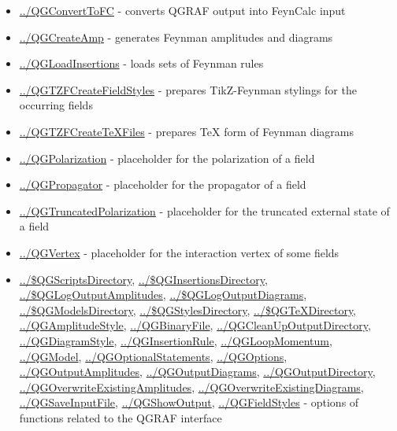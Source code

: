 \documentclass[../FeynHelpersManual.tex]{subfiles}
\begin{document}
\begin{itemize}
\tightlist
\item
  \hyperlink{../qgconverttofc}{../QGConvertToFC} - converts QGRAF output
  into FeynCalc input
\item
  \hyperlink{../qgcreateamp}{../QGCreateAmp} - generates Feynman
  amplitudes and diagrams
\item
  \hyperlink{../qgloadinsertions}{../QGLoadInsertions} - loads sets of
  Feynman rules
\item
  \hyperlink{../qgtzfcreatefieldstyles}{../QGTZFCreateFieldStyles} -
  prepares TikZ-Feynman stylings for the occurring fields
\item
  \hyperlink{../qgtzfcreatetexfiles}{../QGTZFCreateTeXFiles} - prepares
  TeX form of Feynman diagrams
\item
  \hyperlink{../qgpolarization}{../QGPolarization} - placeholder for the
  polarization of a field
\item
  \hyperlink{../qgpropagator}{../QGPropagator} - placeholder for the
  propagator of a field
\item
  \hyperlink{../qgtruncatedpolarization}{../QGTruncatedPolarization} -
  placeholder for the truncated external state of a field
\item
  \hyperlink{../qgvertex}{../QGVertex} - placeholder for the interaction
  vertex of some fields
\item
  \hyperlink{../dollarqgscriptsdirectory}{../\$QGScriptsDirectory},
  \hyperlink{../dollarqginsertionsdirectory}{../\$QGInsertionsDirectory},
  \hyperlink{../dollarqglogoutputamplitudes}{../\$QGLogOutputAmplitudes},
  \hyperlink{../dollarqglogoutputdiagrams}{../\$QGLogOutputDiagrams},
  \hyperlink{../dollarqgmodelsdirectory}{../\$QGModelsDirectory},
  \hyperlink{../dollarqgstylesdirectory}{../\$QGStylesDirectory},
  \hyperlink{../dollarqgtexdirectory}{../\$QGTeXDirectory},
  \hyperlink{../qgamplitudestyle}{../QGAmplitudeStyle},
  \hyperlink{../qgbinaryfile}{../QGBinaryFile},
  \hyperlink{../qgcleanupoutputdirectory}{../QGCleanUpOutputDirectory},
  \hyperlink{../qgdiagramstyle}{../QGDiagramStyle},
  \hyperlink{../qginsertionrule}{../QGInsertionRule},
  \hyperlink{../qgloopmomentum}{../QGLoopMomentum},
  \hyperlink{../qgmodel}{../QGModel},
  \hyperlink{../qgoptionalstatements}{../QGOptionalStatements},
  \hyperlink{../qgoptions}{../QGOptions},
  \hyperlink{../qgoutputamplitudes}{../QGOutputAmplitudes},
  \hyperlink{../qgoutputdiagrams}{../QGOutputDiagrams},
  \hyperlink{../qgoutputdirectory}{../QGOutputDirectory},
  \hyperlink{../qgoverwriteexistingamplitudes}{../QGOverwriteExistingAmplitudes},
  \hyperlink{../qgoverwriteexistingdiagrams}{../QGOverwriteExistingDiagrams},
  \hyperlink{../qgsaveinputfile}{../QGSaveInputFile},
  \hyperlink{../qgshowoutput}{../QGShowOutput},
  \hyperlink{../qgfieldstyles}{../QGFieldStyles} - options of functions
  related to the QGRAF interface
\end{itemize}
\end{document}
